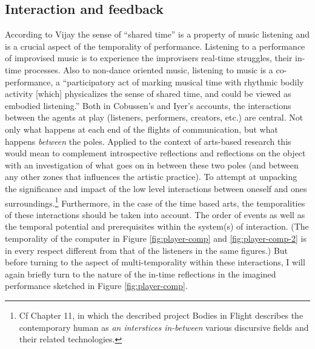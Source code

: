 \subsection{Interaction and feedback}
\label{sec:interaction-feedback}

According to Vijay \citeauthor{iyer08} the sense of ``shared time'' is a property of music listening and is a crucial aspect of the temporality of performance. Listening to a performance of improvised music is to experience the improvisers real-time struggles, their in-time processes. Also to non-dance oriented music, listening to music is a co-performance, a ``participatory act of marking musical time with rhythmic bodily activity [which] physicalizes the sense of shared time, and could be viewed as embodied listening.'' \parencite[276]{iyer08} Both in Cobussen's and Iyer's accounts, the interactions between the agents at play (listeners, performers, creators, etc.) are central. Not only what happens at each end of the flights of communication, but what happens \emph{between} the poles. Applied to the context of arts-based research this would mean to complement introspective reflections and reflections on the object with an investigation of what goes on in between these two poles (and between any other zones that influences the artistic practice). To attempt at unpacking the significance and impact of the low level interactions between oneself and ones surroundings.\footnote{Cf Chapter 11, in which the described project Bodies in Flight describes the contemporary human as \emph{an interstices in-between} various discursive fields and their related
technologies.} Furthermore, in the case of the time based arts, the temporalities of these interactions should be taken into account. The order of events as well as the temporal potential and prerequisites within the system(s) of interaction. (The temporality of the computer in Figure \ref{fig:player-comp} and \ref{fig:player-comp-2} is in every respect different from that of the listeners in the same figures.) But before turning to the aspect of multi-temporality within these interactions, I will again briefly turn to the nature of the in-time reflections in the imagined performance sketched in Figure \ref{fig:player-comp}.

